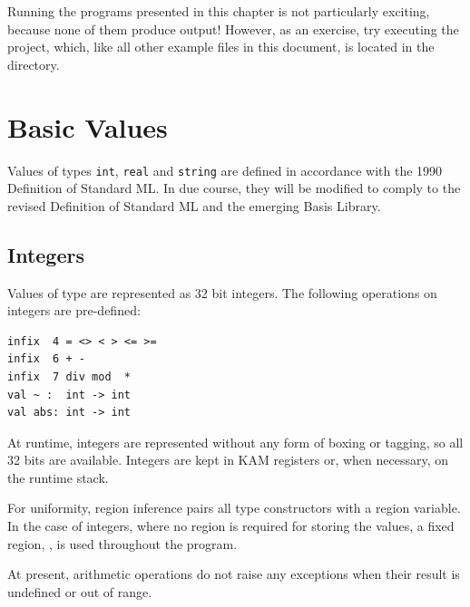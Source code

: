 \documentclass[12pt]{book}
\begin{document}
Running the programs presented in this chapter is not particularly
exciting, because none of them produce output! However, as an
exercise, try executing the  project, which, like all other example files in this
document, is located in the  directory.


\chapter{Basic Values}
Values of types {\tt int}, {\tt real} and {\tt string} are defined in accordance with
the 1990 Definition of Standard ML.
In due course, they will be modified
to comply to the revised Definition of Standard ML and the emerging Basis Library.
\section{Integers}
\label{integers.sec}
Values of type  are represented as 32 bit integers.
The following operations on integers are 
pre-defined:\index{{\tt =}}\index{{\tt <>}}\index{{\tt <}}\index{{\tt >}}\index{{\tt <=}}\index{{\tt >=}}\index{{\tt +}}\index{{\tt -}}\index{{\tt *}}\index{\verb+~+}
\begin{verbatim}
infix  4 = <> < > <= >= 
infix  6 + - 
infix  7 div mod  * 
val ~ :  int -> int
val abs: int -> int
\end{verbatim}
At runtime, integers are represented without any form of boxing or tagging, so
all 32 bits are available.
Integers are kept in KAM registers or, when necessary, 
on the runtime stack. 

For uniformity, region inference pairs all type constructors with a region
variable. In the case of integers, where no region is required for
storing the values, a fixed region, , 
is used throughout the program.

At present, arithmetic operations do not raise any exceptions when their
result is undefined or out of range.
\end{document}
